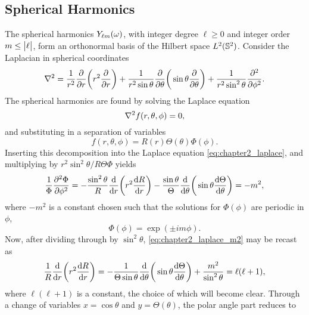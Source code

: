 \subsection{Spherical Harmonics}

The spherical harmonics \({Y}_{\ell m}(\omega)\), with integer degree \(\ell \geq 0\) and integer order \(m \leq \big\lvert\ell\big\rvert\), form an orthonormal basis of the Hilbert space \(L^{2}(\mathbb{S}^{2})\).
Consider the Laplacian in spherical coordinates
%
\begin{equation}
	\laplacian
	= \frac{1}{r^{2}} \pdv{r} \bigg(r^{2} \pdv{r}\bigg)
	+ \frac{1}{r^{2}\sin{\theta}} \pdv{\theta} \bigg(\sin{\theta} \pdv{\theta}\bigg)
	+ \frac{1}{r^{2}\sin^{2}{\theta}} \pdv[2]{\phi}.
\end{equation}
%
The spherical harmonics are found by solving the Laplace equation
%
\begin{equation}\label{eq:chapter2_laplace}
	\laplacian{f(r,\theta,\phi)}
	= 0,
\end{equation}
%
and substituting in a separation of variables
%
\begin{equation}
	f(r,\theta,\phi)
	= R(r)\Theta(\theta)\Phi(\phi).
\end{equation}
%
Inserting this decomposition into the Laplace equation \cref{eq:chapter2_laplace}, and multiplying by \(r^{2}\sin^{2}{\theta}/R\Theta\Phi{}\) yields
%
\begin{equation}\label{eq:chapter2_laplace_m2}
	\frac{1}{\Phi} \pdv[2]{\Phi}{\phi}
	= -\frac{\sin^{2}{\theta}}{R} \dv{r} \bigg(r^{2} \dv{R}{r}\bigg)
	- \frac{\sin{\theta}}{\Theta} \dv{\theta} \bigg(\sin{\theta} \dv{\Theta}{\theta}\bigg)
	= -m^{2},
\end{equation}
%
where \(-m^{2}\) is a constant chosen such that the solutions for \(\Phi(\phi)\) are periodic in \(\phi{}\), \ie{}
%
\begin{equation}
	\Phi(\phi)
	= \exp(\pm i m\phi).
\end{equation}
%
Now, after dividing through by \(\sin^{2}{\theta}\), \cref{eq:chapter2_laplace_m2} may be recast as
%
\begin{equation}
	\frac{1}{R} \dv{r} \bigg(r^{2} \dv{R}{r}\bigg)
	= -\frac{1}{\Theta\sin{\theta}} \dv{\theta} \bigg(\sin{\theta} \dv{\Theta}{\theta}\bigg)
	+ \frac{m^{2}}{\sin^{2}{\theta}}
	= \ell(\ell+1),
\end{equation}
%
where \(\ell(\ell+1)\) is a constant, the choice of which will become clear.
Through a change of variables \(x=\cos{\theta}\) and \(y=\Theta(\theta)\), the polar angle part reduces to
